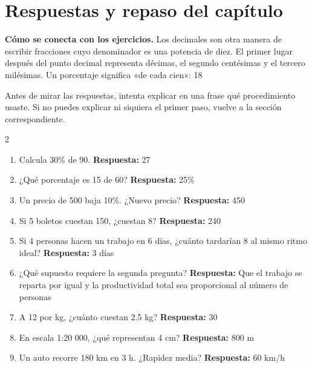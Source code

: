 \documentclass[10pt,oneside,openany]{book}
\begin{document}
\section{Respuestas y repaso del capítulo}

\textbf{Cómo se conecta con los ejercicios.} Los decimales son otra manera de escribir fracciones cuyo denominador es una potencia de diez. El primer lugar después del punto decimal representa décimas, el segundo centésimas y el tercero milésimas. Un porcentaje significa «de cada cien»: 18 %

Antes de mirar las respuestas, intenta explicar en una frase qué procedimiento usaste. Si no puedes explicar ni siquiera el primer paso, vuelve a la sección correspondiente.

\begin{multicols}{2}\begin{enumerate}

\item Calcula 30\% de 90. \textbf{Respuesta:} 27

\item ¿Qué porcentaje es 15 de 60? \textbf{Respuesta:} 25\%

\item Un precio de \textdollar{}500 baja 10\%. ¿Nuevo precio? \textbf{Respuesta:} \textdollar{}450

\item Si 5 boletos cuestan \textdollar{}150, ¿cuestan 8? \textbf{Respuesta:} \textdollar{}240

\item Si 4 personas hacen un trabajo en 6 días, ¿cuánto tardarían 8 al mismo ritmo ideal? \textbf{Respuesta:} 3 días

\item ¿Qué supuesto requiere la segunda pregunta? \textbf{Respuesta:} Que el trabajo se reparta por igual y la productividad total sea proporcional al número de personas

\item A \textdollar{}12 por kg, ¿cuánto cuestan 2.5 kg? \textbf{Respuesta:} \textdollar{}30

\item En escala 1:20 000, ¿qué representan 4 cm? \textbf{Respuesta:} 800 m

\item Un auto recorre 180 km en 3 h. ¿Rapidez media? \textbf{Respuesta:} 60 km/h

\end{enumerate}\end{multicols}
\end{document}
